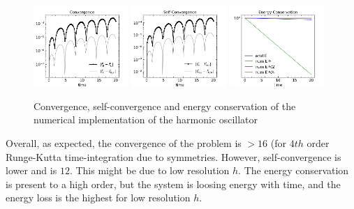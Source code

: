 \documentclass{article}
\begin{document}
\begin{figure}[t]
	\label{fig:harm_oscil_conv}
	\centering 
	\includegraphics[width=0.32\textwidth]{./fig2/convergence_harm_osc.png}
	\includegraphics[width=0.32\textwidth]{./fig2/self-convergence_harm_osc.png}
	\includegraphics[width=0.32\textwidth]{./fig2/energy_conservation.png}
	\caption{Convergence, self-convergence and energy conservation of the numerical implementation of the harmonic oscillator}
\end{figure}

Overall, as expected, the convergence of the problem is $>16$ (for $4th$ order Runge-Kutta time-integration due to symmetries. However, self-convergence is lower and is $12$. This might be due to low resolution $h$. The energy conservation is present to a high order, but the system is loosing energy with time, and the energy loss is the highest for low resolution $h$.
\end{document}
